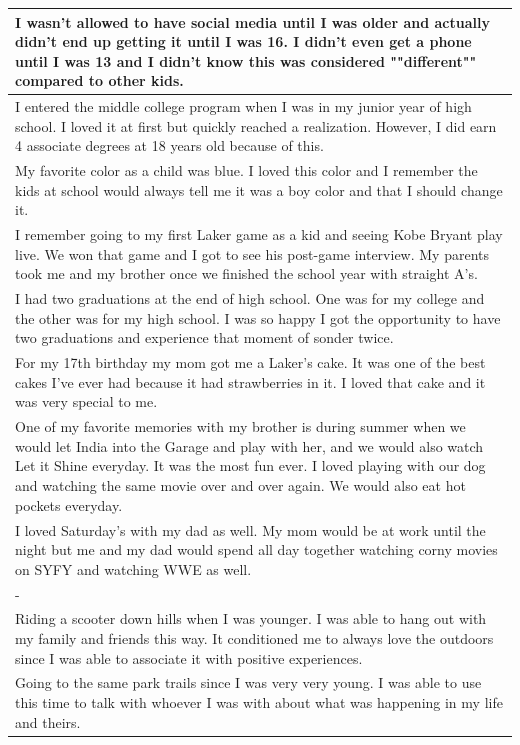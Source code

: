 \documentclass[
  .7em,
  letterpaper,
  DIV=11,
  numbers=noendperiod]{scrartcl}
\begin{document}
\begin{table}
\begin{tabular}{l}
\hline
I wasn't allowed to have social media until I was older and actually didn't end up getting it until I was 16. I didn't even get a phone until I was 13 and I didn't know this was considered ""different"" compared to other kids.\\
\hline
I entered the middle college program when I was in my junior year of high school. I loved it at first but quickly reached a realization. However, I did earn 4 associate degrees at 18 years old because of this.\\
\hline
My favorite color as a child was blue. I loved this color and I remember the kids at school would always tell me it was a boy color and that I should change it.\\
\hline
I remember going to my first Laker game as a kid and seeing Kobe Bryant play live. We won that game and I got to see his post-game interview. My parents took me and my brother once we finished the school year with straight A's.\\
\hline
I had two graduations at the end of high school. One was for my college and the other was for my high school. I was so happy I got the opportunity to have two graduations and experience that moment of sonder twice.\\
\hline
For my 17th birthday my mom got me a Laker's cake. It was one of the best cakes I've ever had because it had strawberries in it. I loved that cake and it was very special to me.\\
\hline
One of my favorite memories with my brother is during summer when we would let India into the Garage and play with her, and we would also watch Let it Shine everyday. It was the most fun ever. I loved playing with our dog and watching the same movie over and over again. We would also eat hot pockets everyday.\\
\hline
I loved Saturday's with my dad as well. My mom would be at work until the night but me and my dad would spend all day together watching corny movies on SYFY and watching WWE as well.\\
\hline
-\\
\hline
Riding a scooter down hills when I was younger. I was able to hang out with my family and friends this way. It conditioned me to always love the outdoors since I was able to associate it with positive experiences.\\
\hline
Going to the same park trails since I was very very young. I was able to use this time to talk with whoever I was with about what was happening in my life and theirs.\\

\end{tabular}
\end{table}
\end{document}
